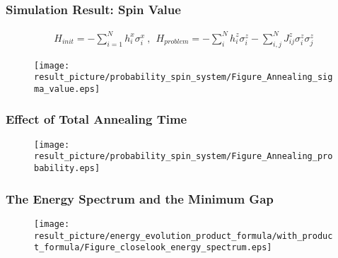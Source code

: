 \documentclass{beamer}
\begin{document}
\begin{frame}
	\frametitle{Simulation Result: Spin Value}
		\begin{equation*}
		\begin{split}
		H_{init}= -\sum_{i=1}^{N}h_i^x \sigma_i^x ~,~~ H_{problem}= -\sum_{i}^N h_i^z \sigma^z_i  -\sum_{i,j}^N J_{ij}^z \sigma^z_i \sigma^z_j
		\end{split}
		\end{equation*} 
	\begin{figure}
		\centering
		\texttt{[image: result\_picture/probability\_spin\_system/Figure\_Annealing\_sigma\_value.eps]}
	\end{figure}
\end{frame}

\begin{frame}
	\frametitle{Effect of Total Annealing Time}
	\begin{figure}
		\centering
		\texttt{[image: result\_picture/probability\_spin\_system/Figure\_Annealing\_probability.eps]}
		
	\end{figure}
\end{frame}

%		

\begin{frame}
	\frametitle{The Energy Spectrum and the Minimum Gap}
	\begin{figure}
		\centering
		\texttt{[image: result\_picture/energy\_evolution\_product\_formula/with\_product\_formula/Figure\_closelook\_energy\_spectrum.eps]}
		
	\end{figure}
\end{frame}
\end{document}
